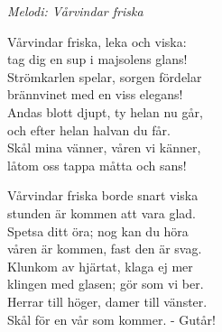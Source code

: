 {\footnotesize\textit{Melodi: Vårvindar friska}}\par
\vspace{10pt}
Vårvindar friska, leka och viska:\\
tag dig en sup i majsolens glans!\\
Strömkarlen spelar, sorgen fördelar\\
brännvinet med en viss elegans!\\
Andas blott djupt, ty helan nu går,\\
och efter helan halvan du får.\\
Skål mina vänner, våren vi känner,\\
låtom oss tappa måtta och sans! \par
\vspace{10pt}
Vårvindar friska borde snart viska\\
stunden är kommen att vara glad.\\
Spetsa ditt öra; nog kan du höra\\
våren är kommen, fast den är svag.\\
Klunkom av hjärtat, klaga ej mer\\
klingen med glasen; gör som vi ber.\\
Herrar till höger, damer till vänster.\\
Skål för en vår som kommer. - Gutår!
